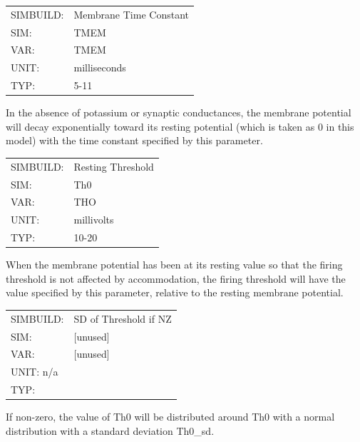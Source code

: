 \documentclass[12pt,openany,oneside]{book}
\begin{document}
\label{TMEM}
\begin{flushleft}
\begin{tabular}{@{}ll@{}}
SIMBUILD: & Membrane Time Constant\\
SIM: & TMEM\\
VAR: & TMEM\\
UNIT: & milliseconds\\
TYP: & 5-11\\
\end{tabular}
\end{flushleft}
\noindent
In the absence of potassium or synaptic conductances, the membrane
potential will decay exponentially toward its resting potential (which
is taken as 0 in this model) with the time constant specified by this
parameter.
\filbreak
\vspace{\baselineskip}

\begin{flushleft}
\begin{tabular}{@{}ll@{}}
SIMBUILD: & Resting Threshold\\
SIM: & Th0\\
VAR: & THO\\
UNIT: & millivolts\\
TYP: & 10-20\\
\end{tabular}
\end{flushleft}
\noindent
When the membrane potential has been at its resting value so that the
firing threshold is not affected by accommodation, the firing
threshold will have the value specified by this parameter, relative to
the resting membrane potential.
\filbreak
\vspace{\baselineskip}

\begin{flushleft}
\begin{tabular}{@{}ll@{}}
SIMBUILD: & SD of Threshold if NZ\\
SIM: & [unused]\\
VAR: & [unused]\\
UNIT: n/a\\
TYP: &\\
\end{tabular}
\end{flushleft}
\noindent
If non-zero, the value of Th0 will be distributed
around Th0 with a normal distribution with a standard deviation Th0\_sd.
\filbreak
\vspace{\baselineskip}
\end{document}
